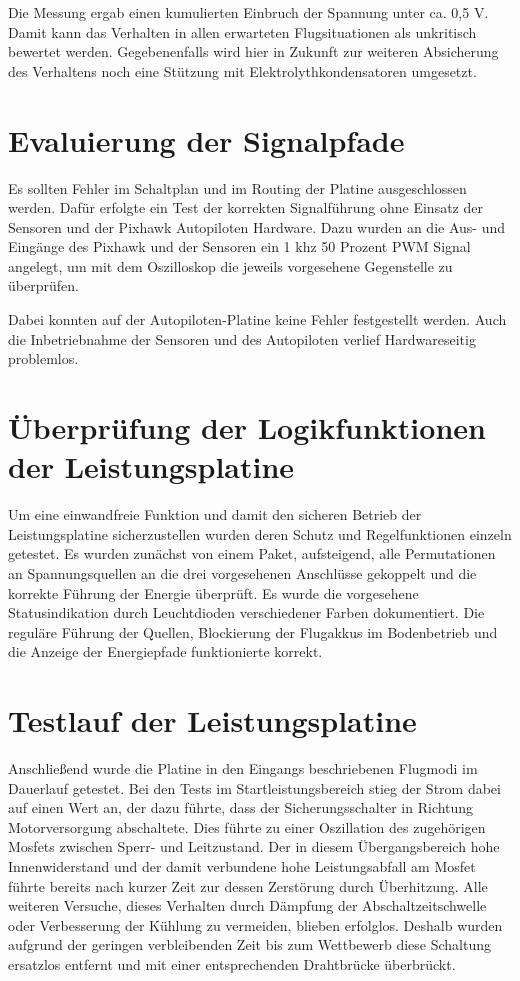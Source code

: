 Die Messung ergab einen kumulierten Einbruch der Spannung  unter ca. 0,5 V. 
Damit kann das Verhalten in allen erwarteten Flugsituationen als unkritisch bewertet werden. Gegebenenfalls wird hier in Zukunft zur weiteren Absicherung des Verhaltens noch eine Stützung mit Elektrolythkondensatoren umgesetzt. 

\section{Evaluierung der Signalpfade}

Es sollten Fehler im Schaltplan und im Routing der Platine ausgeschlossen werden. Dafür erfolgte ein Test der korrekten Signalführung ohne Einsatz der Sensoren und der Pixhawk Autopiloten Hardware. Dazu wurden an die Aus- und Eingänge des Pixhawk und der Sensoren ein 1 khz 50 Prozent PWM Signal angelegt, um mit dem Oszilloskop die jeweils vorgesehene Gegenstelle zu überprüfen.

Dabei konnten auf der Autopiloten-Platine keine Fehler festgestellt werden.
Auch die Inbetriebnahme der Sensoren und des Autopiloten verlief Hardwareseitig problemlos.

\section{Überprüfung der Logikfunktionen der Leistungsplatine}

Um eine einwandfreie Funktion und damit den sicheren Betrieb der Leistungsplatine sicherzustellen wurden deren Schutz und Regelfunktionen einzeln getestet.
Es wurden zunächst von einem Paket, aufsteigend, alle Permutationen an Spannungsquellen an die drei vorgesehenen Anschlüsse gekoppelt und die korrekte Führung der Energie überprüft.
Es wurde die vorgesehene Statusindikation durch Leuchtdioden verschiedener Farben dokumentiert.
Die reguläre Führung der Quellen, Blockierung der Flugakkus im Bodenbetrieb und die Anzeige der Energiepfade funktionierte korrekt.

\section{Testlauf der Leistungsplatine}

Anschließend wurde die Platine in den Eingangs beschriebenen Flugmodi im Dauerlauf getestet.
Bei den Tests im Startleistungsbereich stieg der Strom dabei auf einen Wert an, der dazu führte, dass der Sicherungsschalter in Richtung Motorversorgung abschaltete.
Dies führte zu einer Oszillation des zugehörigen Mosfets zwischen Sperr- und Leitzustand. Der in diesem Übergangsbereich hohe Innenwiderstand und der damit verbundene hohe Leistungsabfall am Mosfet führte bereits nach kurzer Zeit zur dessen Zerstörung durch Überhitzung.
Alle weiteren Versuche, dieses Verhalten durch Dämpfung der Abschaltzeitschwelle oder Verbesserung der Kühlung zu vermeiden, blieben erfolglos. Deshalb wurden aufgrund der geringen verbleibenden Zeit bis zum Wettbewerb diese Schaltung ersatzlos entfernt und mit einer entsprechenden Drahtbrücke überbrückt.
